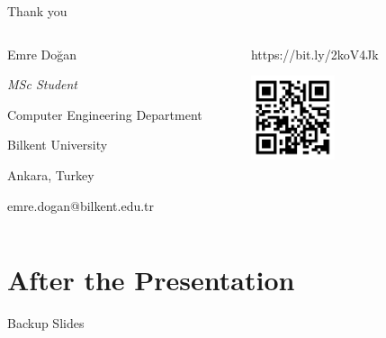 \documentclass{beamer}
\begin{document}
\begin{frame}{Thank you}

\begin{columns}
\begin{column}{0.5\textwidth}
\centering \normalsize Emre Doğan

\centering \small \textit{MSc Student}

\centering \small Computer Engineering Department

\centering \small Bilkent University 

\centering \small Ankara, Turkey

emre.dogan@bilkent.edu.tr
\end{column}
\begin{column}{0.5\textwidth}  %
\centering \Large https://bit.ly/2koV4Jk

\vskip 0.12in

\newline

\vskip 0.12in

\includegraphics[width=0.4\textwidth]{img/qr_code_researchgate.png}
\end{column}
\end{columns}
\end{frame}

\section{After the Presentation}
\begin{frame}[noframenumbering]{Backup Slides}
\end{frame}
\end{document}

